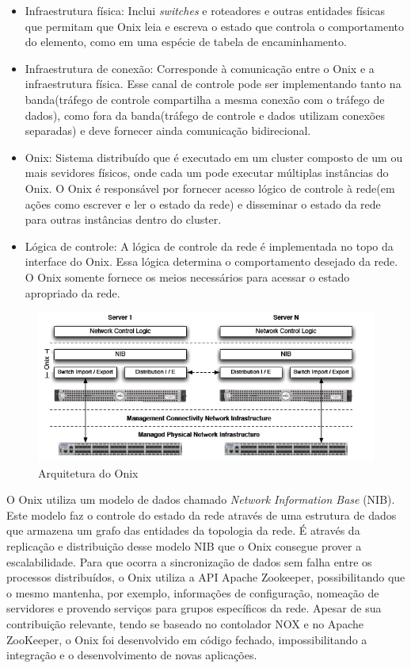\begin{itemize}
    \item Infraestrutura física: Inclui \emph{switches} e roteadores e outras entidades físicas que permitam que Onix leia e escreva o estado que controla o comportamento do elemento, como em uma espécie de tabela de encaminhamento.
    \item Infraestrutura de conexão: Corresponde à comunicação entre o Onix e a infraestrutura física. Esse canal de controle pode ser implementando tanto na banda(tráfego de controle compartilha a mesma conexão com o tráfego de dados), como fora da banda(tráfego de controle e dados utilizam conexões separadas) e deve fornecer ainda comunicação bidirecional.
    \item Onix: Sistema distribuído que é executado em um cluster composto de um ou mais sevidores físicos, onde cada um pode executar múltiplas instâncias do Onix. O Onix é responsável por fornecer acesso lógico de controle à rede(em ações como escrever e ler o estado da rede) e disseminar o estado da rede para outras instâncias dentro do cluster.
    \item Lógica de controle: A lógica de controle da rede é implementada no topo da interface do Onix. Essa lógica determina o comportamento desejado da rede. O Onix somente fornece os meios necessários para acessar o estado apropriado da rede.
\end{itemize}


\begin{figure}[!h]
	\caption{ Arquitetura do Onix}
  \centering
  \includegraphics[scale=1]{Imagens/onix.png} 
 
  \label{onix}
\end{figure}

O Onix utiliza um modelo de dados chamado \emph{Network Information Base} (NIB). Este modelo faz o controle do estado da rede através de uma estrutura de dados que armazena um grafo das entidades da topologia da rede. É através da replicação e distribuição desse modelo NIB que o Onix consegue prover a escalabilidade. Para que ocorra a sincronização de dados sem falha entre os processos distribuídos, o Onix utiliza a API Apache Zookeeper, possibilitando que o mesmo mantenha, por exemplo, informações de configuração, nomeação de servidores e provendo serviços para grupos específicos da rede. Apesar de sua contribuição relevante, tendo se baseado no contolador NOX e no Apache ZooKeeper, o Onix foi desenvolvido em código fechado, impossibilitando a integração e o desenvolvimento de novas aplicações.
\pagebreak
